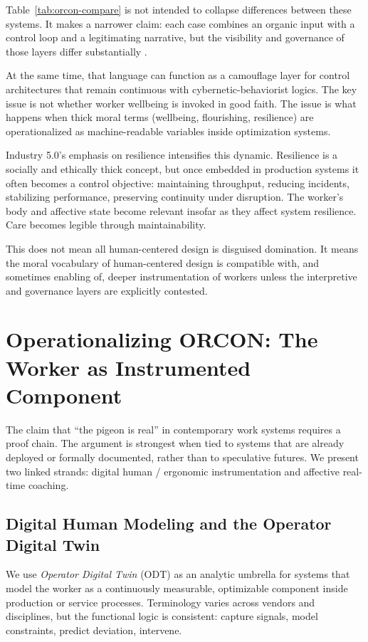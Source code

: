 \documentclass[runningheads]{llncs}
\begin{document}
Table~\ref{tab:orcon-compare} is not intended to collapse differences between these systems. It makes a narrower claim: each case combines an organic input with a control loop and a legitimating narrative, but the visibility and governance of those layers differ substantially \cite{skinner1960pigeons,gray2019ghost,breque2021industry}.

At the same time, that language can function as a camouflage layer for control architectures that remain continuous with cybernetic-behaviorist logics. The key issue is not whether worker wellbeing is invoked in good faith. The issue is what happens when thick moral terms (wellbeing, flourishing, resilience) are operationalized as machine-readable variables inside optimization systems.

Industry 5.0's emphasis on resilience intensifies this dynamic. Resilience is a socially and ethically thick concept, but once embedded in production systems it often becomes a control objective: maintaining throughput, reducing incidents, stabilizing performance, preserving continuity under disruption. The worker's body and affective state become relevant insofar as they affect system resilience. Care becomes legible through maintainability.

This does not mean all human-centered design is disguised domination. It means the moral vocabulary of human-centered design is compatible with, and sometimes enabling of, deeper instrumentation of workers unless the interpretive and governance layers are explicitly contested.

\section{Operationalizing ORCON: The Worker as Instrumented Component}

The claim that ``the pigeon is real'' in contemporary work systems requires a proof chain. The argument is strongest when tied to systems that are already deployed or formally documented, rather than to speculative futures. We present two linked strands: digital human / ergonomic instrumentation and affective real-time coaching.

\subsection{Digital Human Modeling and the Operator Digital Twin}

We use \emph{Operator Digital Twin} (ODT) as an analytic umbrella for systems that model the worker as a continuously measurable, optimizable component inside production or service processes. Terminology varies across vendors and disciplines, but the functional logic is consistent: capture signals, model constraints, predict deviation, intervene.
\end{document}
